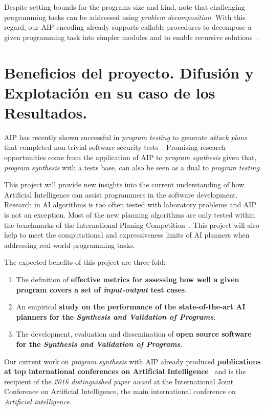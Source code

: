 \documentclass[10pt,a4paper]{paper}
\begin{document}
Despite setting bounds for the programs size and kind, note that challenging programming tasks can be addressed using {\em problem decomposition}. With this regard, our AIP encoding already supports callable procedures to decompose a given programming task into simpler modules and to enable recursive solutions~\cite{sergio:aprograming:icaps16,sergio:aprograming:ijcai16}.


\newpage
\section{Beneficios del proyecto. Difusión y Explotación en su caso de los Resultados.}
\label{subsec:beneficios}
AIP has recently shown successful in {\em program testing} to generate {\em attack plans} that completed non-trivial software security tests~\cite{hoffmann2015simulated,steinmetz2016revisiting,shmaryahu2016constructing,steinmetz2016goal}. Promising research opportunities come from the application of AIP to {\em program synthesis} given that, {\em program synthesis} with a tests base, can also be seen as a dual to {\em program testing}. 

This project will provide new insights into the current understanding of how Artificial Intelligence can assist programmers in the software development. Research in AI algorithms is too often tested with laboratory problems and AIP is not an exception. Most of the new planning algorithms are only tested within the benchmarks of the International Planing Competition~\cite{vallati:IPC:AI15}. This project will also help to meet the computational and expressiveness limits of AI planners when addressing real-world programming tasks. 

The expected benefits of this project are three-fold:
\begin{enumerate}
\item The definition of {\bf effective metrics for assessing how well a given program covers a set of {\em input-output} test cases}.
\item An empirical {\bf study on the performance of the state-of-the-art AI planners for the {\em Synthesis and Validation of Programs}}.
\item The development, evaluation and dissemination of {\bf open source software for the {\em Synthesis and Validation of Programs}}.
\end{enumerate}

Our current work on {\em program synthesis} with AIP already produced {\bf publications at top international conferences on Artificial Intelligence}~\cite{segovia2017generating,sergio:aprogramingb:ijcai16,sergio:aprograming:ijcai16,sergio:aprograming:icaps16} and is the recipient of the {\it 2016 distinguished paper award} at the International Joint Conference on Artificial Intelligence, the main international conference on {\em Artificial intelligence}.
\end{document}
